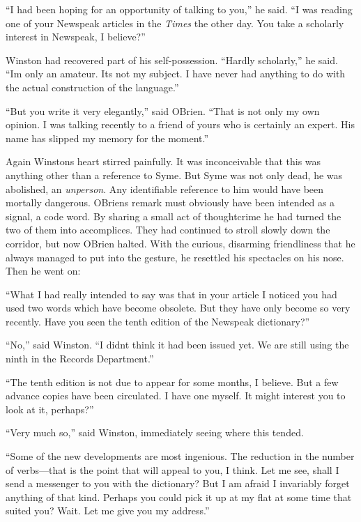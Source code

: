 ``I had been hoping for an opportunity of talking to you,'' he said. ``I
was reading one of your Newspeak articles in the \emph{Times} the other
day. You take a scholarly interest in Newspeak, I believe?''

Winston had recovered part of his self-possession. ``Hardly scholarly,''
he said. ``I\textquotesingle m only an amateur. It\textquotesingle s not
my subject. I have never had anything to do with the actual construction
of the language.''

``But you write it very elegantly,'' said O\textquotesingle Brien. ``That
is not only my own opinion. I was talking recently to a friend of yours
who is certainly an expert. His name has slipped my memory for the
moment.''

Again Winston\textquotesingle s heart stirred painfully. It was
inconceivable that this was anything other than a reference to Syme. But
Syme was not only dead, he was abolished, an \emph{unperson}. Any
identifiable reference to him would have been mortally dangerous.
O\textquotesingle Brien\textquotesingle s remark must obviously have
been intended as a signal, a code word. By sharing a small act of
thoughtcrime he had turned the two of them into accomplices. They had
continued to stroll slowly down the corridor, but now
O\textquotesingle Brien halted. With the curious, disarming friendliness
that he always managed to put into the gesture, he resettled his
spectacles on his nose. Then he went on:

``What I had really intended to say was that in your article I noticed
you had used two words which have become obsolete. But they have only
become so very recently. Have you seen the tenth edition of the Newspeak
dictionary?''

``No,'' said Winston. ``I didn\textquotesingle t think it had been issued
yet. We are still using the ninth in the Records Department.''

``The tenth edition is not due to appear for some months, I believe. But
a few advance copies have been circulated. I have one myself. It might
interest you to look at it, perhaps?''

``Very much so,'' said Winston, immediately seeing where this tended.

``Some of the new developments are most ingenious. The reduction in the
number of verbs---that is the point that will appeal to you, I think.
Let me see, shall I send a messenger to you with the dictionary? But I
am afraid I invariably forget anything of that kind. Perhaps you could
pick it up at my flat at some time that suited you? Wait. Let me give
you my address.''

